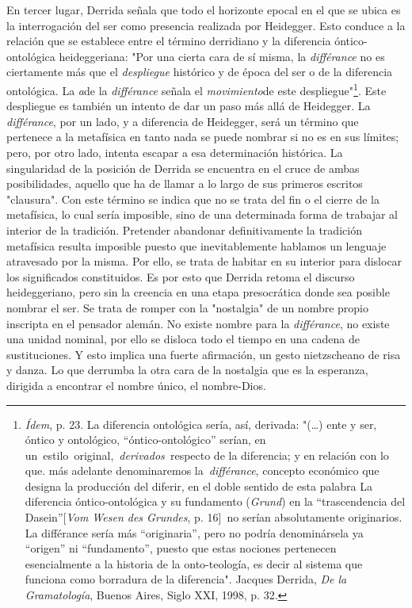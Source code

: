 \documentclass{book}
\begin{document}
En tercer lugar, Derrida señala que todo el horizonte epocal en el que
se ubica es la interrogación del ser como presencia realizada por
Heidegger. Esto conduce a la relación que se establece entre el término
derridiano y la diferencia óntico-ontológica heideggeriana: "Por una
cierta cara de sí misma, la \emph{différance} no es ciertamente más que
el \emph{despliegue} histórico y de época del ser o de la diferencia
ontológica. La \emph{a}de la \emph{différance} señala el
\emph{movimiento}de este despliegue"\footnote{\emph{Ídem}, p. 23. La
  diferencia ontológica sería, así, derivada: "(\dots) ente y ser,
  óntico y ontológico, ``óntico-ontológico'' serían, en
  un~estilo\emph{~}original,~\emph{derivados~}respecto de la diferencia;
  y en relación con lo que. más adelante denominaremos
  la~\emph{différance}, concepto económico que designa la producción del
  diferir, en el doble sentido de esta palabra La diferencia
  óntico-ontológica y su fundamento (\emph{Grund}) en la ``trascendencia
  del Dasein''{[}\emph{Vom Wesen des Grundes}, p. 16{]}\emph{~}no serían
  absolutamente originarios. La différance sería más ``originaria'',
  pero no podría denominársela ya ``origen'' ni ``fundamento'', puesto
  que estas nociones pertenecen esencialmente a la historia de la
  onto-teología, es decir al sistema que funciona como borradura de la
  diferencia". Jacques Derrida, \emph{De la Gramatología}, Buenos Aires,
  Siglo XXI, 1998, p. 32.}. Este despliegue es también un intento de dar
un paso más allá de Heidegger. La \emph{différance}, por un lado, y a
diferencia de Heidegger, será un término que pertenece a la metafísica
en tanto nada se puede nombrar si no es en sus límites; pero, por otro
lado, intenta escapar a esa determinación histórica. La singularidad de
la posición de Derrida se encuentra en el cruce de ambas posibilidades,
aquello que ha de llamar a lo largo de sus primeros escritos "clausura".
Con este término se indica que no se trata del fin o el cierre de la
metafísica, lo cual sería imposible, sino de una determinada forma de
trabajar al interior de la tradición. Pretender abandonar
definitivamente la tradición metafísica resulta imposible puesto que
inevitablemente hablamos un lenguaje atravesado por la misma. Por ello,
se trata de habitar en su interior para dislocar los significados
constituidos. Es por esto que Derrida retoma el discurso heideggeriano,
pero sin la creencia en una etapa presocrática donde sea posible nombrar
el ser. Se trata de romper con la "nostalgia" de un nombre propio
inscripta en el pensador alemán. No existe nombre para la
\emph{différance}, no existe una unidad nominal, por ello se disloca
todo el tiempo en una cadena de sustituciones. Y esto implica una fuerte
afirmación, un gesto nietzscheano de risa y danza. Lo que derrumba la
otra cara de la nostalgia que es la esperanza, dirigida a encontrar el
nombre único, el nombre-Dios.
\end{document}
